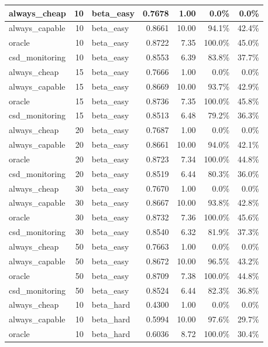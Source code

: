 \documentclass[11pt]{article}
\begin{document}
\begin{table}[h]
\begin{tabular}{l|r|l|r|r|r|r}
\midrule
always\_cheap & 10 & beta\_easy & 0.7678 & 1.00 & 0.0\% & 0.0\% \\
\midrule
always\_capable & 10 & beta\_easy & 0.8661 & 10.00 & 94.1\% & 42.4\% \\
\midrule
oracle & 10 & beta\_easy & 0.8722 & 7.35 & 100.0\% & 45.0\% \\
\midrule
csd\_monitoring & 10 & beta\_easy & 0.8553 & 6.39 & 83.8\% & 37.7\% \\
\midrule
always\_cheap & 15 & beta\_easy & 0.7666 & 1.00 & 0.0\% & 0.0\% \\
\midrule
always\_capable & 15 & beta\_easy & 0.8669 & 10.00 & 93.7\% & 42.9\% \\
\midrule
oracle & 15 & beta\_easy & 0.8736 & 7.35 & 100.0\% & 45.8\% \\
\midrule
csd\_monitoring & 15 & beta\_easy & 0.8513 & 6.48 & 79.2\% & 36.3\% \\
\midrule
always\_cheap & 20 & beta\_easy & 0.7687 & 1.00 & 0.0\% & 0.0\% \\
\midrule
always\_capable & 20 & beta\_easy & 0.8661 & 10.00 & 94.0\% & 42.1\% \\
\midrule
oracle & 20 & beta\_easy & 0.8723 & 7.34 & 100.0\% & 44.8\% \\
\midrule
csd\_monitoring & 20 & beta\_easy & 0.8519 & 6.44 & 80.3\% & 36.0\% \\
\midrule
always\_cheap & 30 & beta\_easy & 0.7670 & 1.00 & 0.0\% & 0.0\% \\
\midrule
always\_capable & 30 & beta\_easy & 0.8667 & 10.00 & 93.8\% & 42.8\% \\
\midrule
oracle & 30 & beta\_easy & 0.8732 & 7.36 & 100.0\% & 45.6\% \\
\midrule
csd\_monitoring & 30 & beta\_easy & 0.8540 & 6.32 & 81.9\% & 37.3\% \\
\midrule
always\_cheap & 50 & beta\_easy & 0.7663 & 1.00 & 0.0\% & 0.0\% \\
\midrule
always\_capable & 50 & beta\_easy & 0.8672 & 10.00 & 96.5\% & 43.2\% \\
\midrule
oracle & 50 & beta\_easy & 0.8709 & 7.38 & 100.0\% & 44.8\% \\
\midrule
csd\_monitoring & 50 & beta\_easy & 0.8524 & 6.44 & 82.3\% & 36.8\% \\
\midrule
always\_cheap & 10 & beta\_hard & 0.4300 & 1.00 & 0.0\% & 0.0\% \\
\midrule
always\_capable & 10 & beta\_hard & 0.5994 & 10.00 & 97.6\% & 29.7\% \\
\midrule
oracle & 10 & beta\_hard & 0.6036 & 8.72 & 100.0\% & 30.4\% \\

\end{tabular}
\end{table}
\end{document}
